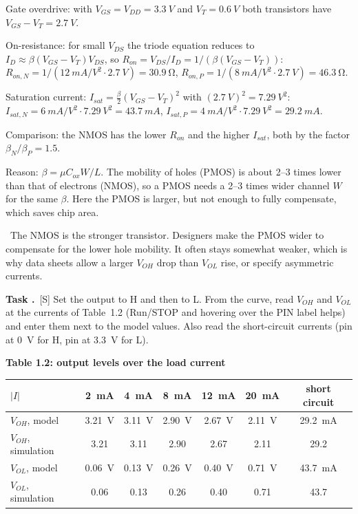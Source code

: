 \documentclass[a4paper,11pt]{article}
\newcounter{task}[section]
\renewcommand{\thetask}{\thesection.\arabic{task}}
\newcommand{\task}[1]{\par\medskip\refstepcounter{task}%
  {\sffamily\bfseries\color{rwuviolet}Task \thetask}\ {\sffamily\small\color{rwucyandark}[#1]}\quad}
\newenvironment{solution}{\begin{solbox}}{\end{solbox}}
\newcommand{\answer}{\par\smallskip{\sffamily\bfseries\color{rwuviolet}Answer:}\ }
\newcommand{\simv}[1]{\textcolor{rwuviolet}{#1}}
\newcommand{\simv}[1]{}
\newenvironment{results}[2]{\par\smallskip\begin{center}\small\sffamily
  {\color{rwucyandark}\bfseries #1}\\[1mm]\renewcommand{\arraystretch}{1.25}\begin{tabular}{#2}\toprule}
  {\bottomrule\end{tabular}\end{center}}
\begin{document}
\begin{solution}
\begin{steps}
  \item Gate overdrive: with $V_{GS}=V_{DD}=\SI{3.3}{V}$ and $V_T=\SI{0.6}{V}$ both transistors have
        $V_{GS}-V_T=\SI{2.7}{V}$.
  \item On-resistance: for small $V_{DS}$ the triode equation reduces to $I_D\approx\beta(V_{GS}-V_T)V_{DS}$, so
        $R_{on}=V_{DS}/I_D=1/(\beta(V_{GS}-V_T))$:\\
        $R_{on,N}=1/(\SI{12}{mA/V^2}\cdot\SI{2.7}{V})=\SI{30.9}{\ohm}$,\quad
        $R_{on,P}=1/(\SI{8}{mA/V^2}\cdot\SI{2.7}{V})=\SI{46.3}{\ohm}$.
  \item Saturation current: $I_{sat}=\tfrac{\beta}{2}(V_{GS}-V_T)^2$ with $(\SI{2.7}{V})^2=\SI{7.29}{V^2}$:\\
        $I_{sat,N}=\SI{6}{mA/V^2}\cdot\SI{7.29}{V^2}=\SI{43.7}{mA}$,\quad
        $I_{sat,P}=\SI{4}{mA/V^2}\cdot\SI{7.29}{V^2}=\SI{29.2}{mA}$.
  \item Comparison: the NMOS has the lower $R_{on}$ and the higher $I_{sat}$, both by the factor
        $\beta_N/\beta_P=1.5$.
  \item Reason: $\beta=\mu C_{ox}W/L$. The mobility of holes (PMOS) is about 2--3 times lower than that of
        electrons (NMOS), so a PMOS needs a 2--3 times wider channel $W$ for the same $\beta$. Here the PMOS is
        larger, but not enough to fully compensate, which saves chip area.
\end{steps}
\answer The NMOS is the stronger transistor. Designers make the PMOS wider to compensate for the lower hole
mobility. It often stays somewhat weaker, which is why data sheets allow a larger $V_{OH}$ drop than $V_{OL}$ rise,
or specify asymmetric currents.
\end{solution}

\task{S} Set the output to \textsf{H} and then to \textsf{L}. From the curve, read $V_{OH}$ and $V_{OL}$ at the
currents of Table~1.2 (Run/STOP and hovering over the PIN label helps) and enter them next to the model values.
Also read the short-circuit currents (pin at \SI{0}{V} for \textsf{H}, pin at \SI{3.3}{V} for \textsf{L}).

\begin{results}{Table 1.2: output levels over the load current}{lcccccc}
  $|I|$ & \SI{2}{mA} & \SI{4}{mA} & \SI{8}{mA} & \SI{12}{mA} & \SI{20}{mA} & short circuit\\ \midrule
  $V_{OH}$, model & \SI{3.21}{V} & \SI{3.11}{V} & \SI{2.90}{V} & \SI{2.67}{V} & \SI{2.11}{V} & \SI{29.2}{mA}\\
  $V_{OH}$, simulation & \simv{3.21} & \simv{3.11} & \simv{2.90} & \simv{2.67} & \simv{2.11} & \simv{29.2}\\ \midrule
  $V_{OL}$, model & \SI{0.06}{V} & \SI{0.13}{V} & \SI{0.26}{V} & \SI{0.40}{V} & \SI{0.71}{V} & \SI{43.7}{mA}\\
  $V_{OL}$, simulation & \simv{0.06} & \simv{0.13} & \simv{0.26} & \simv{0.40} & \simv{0.71} & \simv{43.7}\\
\end{results}
\end{document}
